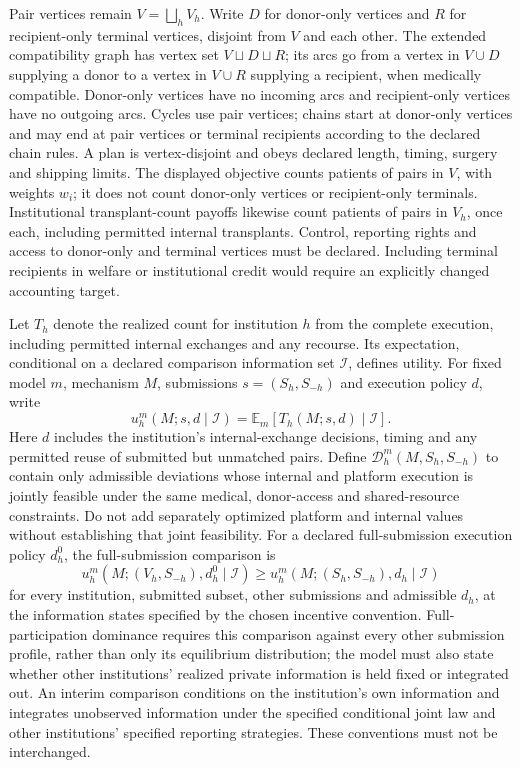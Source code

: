 \documentclass[11pt,a4paper]{article}
\begin{document}
Pair vertices remain \(V=\bigsqcup_hV_h\). Write \(D\) for donor-only vertices and \(R\) for recipient-only terminal vertices, disjoint from \(V\) and each other. The extended compatibility graph has vertex set \(V\sqcup D\sqcup R\); its arcs go from a vertex in \(V\cup D\) supplying a donor to a vertex in \(V\cup R\) supplying a recipient, when medically compatible. Donor-only vertices have no incoming arcs and recipient-only vertices have no outgoing arcs. Cycles use pair vertices; chains start at donor-only vertices and may end at pair vertices or terminal recipients according to the declared chain rules. A plan is vertex-disjoint and obeys declared length, timing, surgery and shipping limits. The displayed objective counts patients of pairs in \(V\), with weights \(w_i\); it does not count donor-only vertices or recipient-only terminals. Institutional transplant-count payoffs likewise count patients of pairs in \(V_h\), once each, including permitted internal transplants. Control, reporting rights and access to donor-only and terminal vertices must be declared. Including terminal recipients in welfare or institutional credit would require an explicitly changed accounting target.

Let \(T_h\) denote the realized count for institution \(h\) from the complete execution, including permitted internal exchanges and any recourse. Its expectation, conditional on a declared comparison information set \(\mathcal I\), defines utility. For fixed model \(m\), mechanism \(M\), submissions \(s=(S_h,S_{-h})\) and execution policy \(d\), write
\[
 u_h^m(M;s,d\mid\mathcal I)=\mathbb E_m[T_h(M;s,d)\mid\mathcal I].
\]
Here \(d\) includes the institution's internal-exchange decisions, timing and any permitted reuse of submitted but unmatched pairs. Define \(\mathcal D_h^m(M,S_h,S_{-h})\) to contain only admissible deviations whose internal and platform execution is jointly feasible under the same medical, donor-access and shared-resource constraints. Do not add separately optimized platform and internal values without establishing that joint feasibility. For a declared full-submission execution policy \(d_h^0\), the full-submission comparison is
\[
 u_h^m(M;(V_h,S_{-h}),d_h^0\mid\mathcal I)
 \geq u_h^m(M;(S_h,S_{-h}),d_h\mid\mathcal I)
\]
for every institution, submitted subset, other submissions and admissible \(d_h\), at the information states specified by the chosen incentive convention. Full-participation dominance requires this comparison against every other submission profile, rather than only its equilibrium distribution; the model must also state whether other institutions' realized private information is held fixed or integrated out. An interim comparison conditions on the institution's own information and integrates unobserved information under the specified conditional joint law and other institutions' specified reporting strategies. These conventions must not be interchanged.
\end{document}

